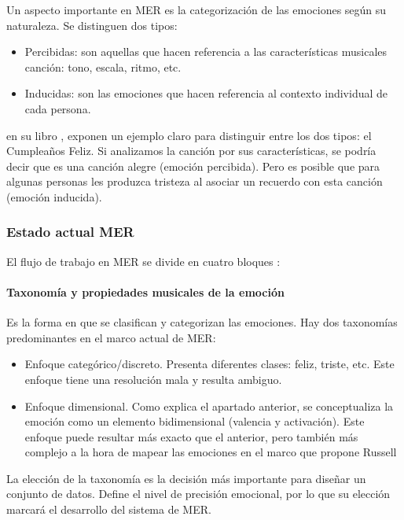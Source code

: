 \documentclass[12pt,a4paper]{article}
\begin{document}
Un aspecto importante en MER es la categorización de las emociones según su naturaleza. Se distinguen dos tipos:
\begin{itemize}
\item Percibidas: son aquellas que hacen referencia a las características musicales canción: tono, escala, ritmo, etc.
\item Inducidas: son las emociones que hacen referencia al contexto individual de cada persona.
\end{itemize}

\citeauthor{yang2011music} en su libro  \cite{yang2011music}, exponen un ejemplo claro para distinguir entre los dos tipos: el Cumpleaños Feliz. Si analizamos la canción por sus características, se podría decir que es una canción alegre (emoción percibida). Pero es posible que para algunas personas les produzca tristeza al asociar un recuerdo con esta canción (emoción inducida).

\subsubsection{Estado actual MER}
El flujo de trabajo en MER se divide en cuatro bloques \cite{GomezCanon2021SPM}:


\paragraph{Taxonomía y propiedades musicales de la emoción}\label{tax_emo}
Es la forma en que se clasifican y categorizan las emociones. Hay dos taxonomías predominantes en el marco actual de MER:
\begin{itemize}
	\item Enfoque categórico/discreto. Presenta diferentes clases: feliz, triste, etc. Este enfoque tiene una resolución mala y resulta ambiguo.
	\item Enfoque dimensional. Como explica el apartado anterior, se conceptualiza la emoción como un elemento bidimensional (valencia y activación). Este enfoque puede resultar más exacto que el anterior, pero también más complejo a la hora de mapear las emociones en el marco que propone Russell \cite{posner2005circumplex}
\end{itemize}

La elección de la taxonomía es la decisión más importante para diseñar un conjunto de datos. Define el nivel de precisión emocional, por lo que su elección marcará el desarrollo del sistema de MER.
\end{document}
